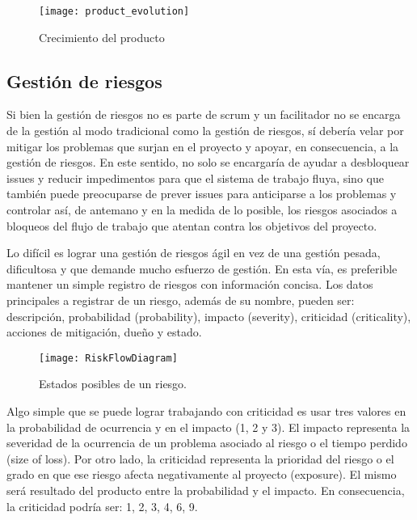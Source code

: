 \begin{figure}[h]
  \centering
  \texttt{[image: product\_evolution]}
  \caption{Crecimiento del producto}
  \centering
  \label{fig:product_evolution} %
\end{figure}

\subsection{Gestión de riesgos}

Si bien la gestión de riesgos no es parte de scrum y un facilitador no se encarga de la gestión al modo tradicional como la gestión de riesgos, sí debería velar por mitigar los problemas que surjan en el proyecto y apoyar, en consecuencia, a la gestión de riesgos. En este sentido, no solo se encargaría de ayudar a desbloquear issues y reducir impedimentos para que el sistema de trabajo fluya, sino que también puede preocuparse de prever issues para anticiparse a los problemas y controlar así, de antemano y en la medida de lo posible, los riesgos asociados a bloqueos del flujo de trabajo que atentan contra los objetivos del proyecto.

Lo difícil es lograr una gestión de riesgos ágil en vez de una gestión pesada, dificultosa y que demande mucho esfuerzo de gestión. En esta vía, es preferible mantener un simple registro de riesgos con información concisa. Los datos principales a registrar de un riesgo, además de su nombre, pueden ser: descripción, probabilidad (probability), impacto (severity), criticidad (criticality), acciones de mitigación, dueño y estado.

\begin{figure}[h]
  \centering
  \texttt{[image: RiskFlowDiagram]}
  \caption{Estados posibles de un riesgo.}
  \centering
  \label{fig:RiskFlowDiagram} %
\end{figure}

Algo simple que se puede lograr trabajando con criticidad es usar tres valores en la probabilidad de ocurrencia y en el impacto (1, 2 y 3). El impacto representa la severidad de la ocurrencia de un problema asociado al riesgo o el tiempo perdido (size of loss). Por otro lado, la criticidad representa la prioridad del riesgo o el grado en que ese riesgo afecta negativamente al proyecto (exposure). El mismo será resultado del producto entre la probabilidad y el impacto. En consecuencia, la criticidad podría ser: 1, 2, 3, 4, 6, 9.

